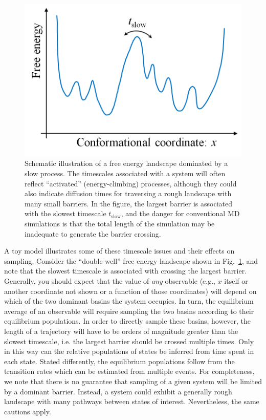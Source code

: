 


\begin{figure}
  \centering
  \includegraphics[width=0.9\linewidth]{figures/1d-landscape-tslow}
  \caption{
  \label{fig:landscape} 
  Schematic illustration of a free energy landscape dominated by a slow process.
  The timescales associated with a system will often reflect ``activated'' (energy-climbing) processes, although they could also indicate diffusion times for traversing a rough landscape with many small barriers.
  In the figure, the largest barrier is associated with the slowest timescale $t_{\mathrm{slow}}$, and the danger for conventional MD simulations is that the total length of the simulation may be inadequate to generate the barrier crossing.
  }
\end{figure}

A toy model illustrates some of these timescale issues and their effects on sampling.
Consider the ``double-well'' free energy landscape shown in Fig.\ \ref{fig:landscape}, and note that the slowest timescale is associated with crossing the largest barrier.  Generally, you should expect that the value of \emph{any} observable (e.g., $x$ itself or another coordinate not shown or a function of those coordinates) will depend on which of the two dominant basins the system occupies.  In turn, the equilibrium average of an observable will require sampling the two basins according to their equilibrium populations.  In order to directly sample these basins, however, the length of a trajectory will have to be orders of magnitude greater than the slowest timescale, i.e. the largest barrier should be crossed multiple times.  Only in this way can the relative populations of states be inferred from time spent in each state.  Stated differently, the equilibrium populations follow from the transition rates \cite{Zuckerman2011,Chou11,Kolmogoroff1936} which can be estimated from multiple events.  For completeness, we note that there is no guarantee that sampling of a given system will be limited by a dominant barrier.  Instead, a system could exhibit a generally rough landscape with many pathways between states of interest.
Nevertheless, the same cautions apply.

